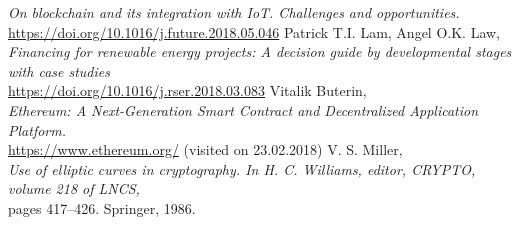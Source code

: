 \documentclass[11pt]{article}
\begin{document}
\begin{thebibliography}{22}
	\textit{On blockchain and its integration with IoT. Challenges and opportunities.}\\
	\hyperref[https://doi.org/10.1016/j.future.2018.05.046]{https://doi.org/10.1016/j.future.2018.05.046}
	Patrick T.I. Lam, Angel O.K. Law, \\
	\textit{Financing for renewable energy projects: A decision guide by developmental stages with case studies}\\
	\hyperref[https://doi.org/10.1016/j.rser.2018.03.083]{https://doi.org/10.1016/j.rser.2018.03.083}
	Vitalik Buterin, \\
	\textit{Ethereum: A Next-Generation Smart
Contract and Decentralized Application Platform.}\\
	\hyperref[https://www.ethereum.org/]{https://www.ethereum.org/}  (visited on 23.02.2018)
	V. S. Miller, \\
	\textit{Use of elliptic curves in cryptography. In H. C. Williams, editor, CRYPTO, volume 218 of
LNCS,}\\
	  pages 417–426. Springer, 1986.
	



\end{thebibliography}

	
\end{document}
